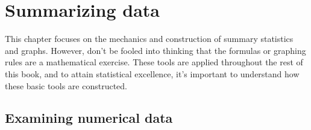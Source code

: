 \chapter{Summarizing data}
\label{summarizingData}
\label{ch_summarizing_data}



This chapter focuses on the mechanics and construction
of summary statistics and graphs.
However, don't be fooled into thinking that the formulas
or graphing rules are a mathematical exercise.
These tools are applied throughout the rest of this book,
and to attain statistical excellence,
it's important to understand how these basic tools
are constructed.


\section[Examining numerical data]{Examining numerical data ~}
\label{numericalData}

\newcommand{\loanA}{10.90}
\newcommand{\loanB}{9.92}
\newcommand{\loanC}{26.30}
\newcommand{\loanD}{9.92}
\newcommand{\loanY}{9.43}
\newcommand{\loanZ}{6.08}
\newcommand{\loanAvg}{11.57}
\newcommand{\loanVar}{25.52}
\newcommand{\loanSD}{5.05}
\newcommand{\loanN}{50}
\newcommand{\loanMedianBelow}{9.93}
\newcommand{\loanMedianAbove}{9.93}
\newcommand{\loanMedian}{9.93}
\newcommand{\loanQA}{7.96}
\newcommand{\loanQC}{13.72}
\newcommand{\loanIQR}{5.76}
\newcommand{\loanAdev}{-0.67}
\newcommand{\loanBdev}{-1.65}
\newcommand{\loanCdev}{14.73}
\newcommand{\loanDdev}{-1.65}
\newcommand{\loanYdev}{-2.14}
\newcommand{\loanZdev}{-5.49}
\newcommand{\loanSmallestValue}{5.31}
\newcommand{\loanLargestValue}{26.30}



